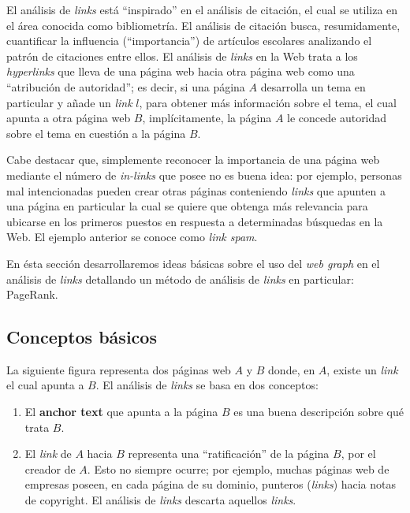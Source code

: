 	El análisis de \textit{links} está \enquote{inspirado} en el análisis de citación, el cual se utiliza en el área conocida como bibliometría. El análisis de citación busca, resumidamente, cuantificar la influencia (\enquote{importancia}) de artículos escolares analizando el patrón de citaciones entre ellos. El análisis de \textit{links} en la Web trata a los \textit{hyperlinks} que lleva de una página web hacia otra página web como una \enquote{atribución de autoridad}; es decir, si una página $A$ desarrolla un tema en particular y añade un \textit{link} $l$, para obtener más información sobre el tema, el cual apunta a otra página web $B$, implícitamente, la página $A$ le concede autoridad sobre el tema en cuestión a la página $B$. \par
	
	Cabe destacar que, simplemente reconocer la importancia de una página web mediante el número de \textit{in-links} que posee no es buena idea: por ejemplo, personas mal intencionadas pueden crear otras páginas conteniendo \textit{links} que apunten a una página en particular la cual se quiere que obtenga más relevancia para ubicarse en los primeros puestos en respuesta a determinadas búsquedas en la Web. El ejemplo anterior se conoce como \textit{link spam}. \par
	
	En ésta sección desarrollaremos ideas básicas sobre el uso del \textit{web graph} en el análisis de \textit{links} detallando un método de análisis de \textit{links} en particular: PageRank.
	
	\subsection{Conceptos básicos}
		La siguiente figura representa dos páginas web $A$ y $B$ donde, en $A$, existe un \textit{link} el cual apunta a $B$. El análisis de \textit{links} se basa en dos conceptos:
		\begin{enumerate}
			\item El \textbf{anchor text} que apunta a la página $B$ es una buena descripción sobre qué trata $B$.
			\item El \textit{link} de $A$ hacia $B$ representa una \enquote{ratificación} de la página $B$, por el creador de $A$. Esto no siempre ocurre; por ejemplo, muchas páginas web de empresas poseen, en cada página de su dominio, punteros (\textit{links}) hacia notas de copyright. El análisis de \textit{links} descarta aquellos \textit{links}.
		\end{enumerate}
		
